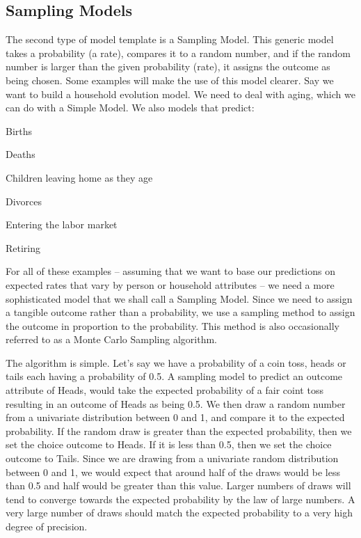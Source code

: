 \subsection{Sampling Models}
The second type of model template is a Sampling Model.  This generic model takes a probability (a rate), compares it to a random number, and if the random number is larger than the given probability (rate), it assigns the outcome as being chosen.  Some examples will make the use of this model clearer. Say we want to build a household evolution model.  We need to deal with aging, which we can do with a Simple Model.  We also models that predict:

\squishlist
\item Births
\item Deaths
\item Children leaving home as they age
\item Divorces
\item Entering the labor market
\item Retiring
\squishend

For all of these examples -- assuming that we want to base our predictions on expected rates that vary by person or household attributes -- we need a more sophisticated model that we shall call a Sampling Model.  Since we need to assign a tangible outcome rather than a probability, we use a sampling method to assign the outcome in proportion to the probability.  This method is also occasionally referred to as a Monte Carlo Sampling algorithm.

The algorithm is simple.  Let's say we have a probability of a coin toss, heads or tails each having a probability of 0.5.  A sampling model to predict an outcome attribute of Heads, would take the expected probability of a fair coint toss resulting in an outcome of Heads as being 0.5.  We then draw a random number from a univariate distribution between 0 and 1, and compare it to the expected probability. If the random draw is greater than the expected probability, then we set the choice outcome to Heads.  If it is less than 0.5, then we set the choice outcome to Tails.  Since we are drawing from a univariate random distribution between 0 and 1, we would expect that around half of the draws would be less than 0.5 and half would be greater than this value.  Larger numbers of draws will tend to converge towards the expected probability by the law of large numbers.  A very large number of draws should match the expected probability to a very high degree of precision.

